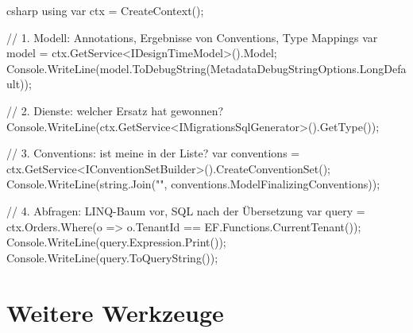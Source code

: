 \begin{sourcecode}{csharp}
using var ctx = CreateContext();

// 1. Modell: Annotations, Ergebnisse von Conventions, Type Mappings
var model = ctx.GetService<IDesignTimeModel>().Model;
Console.WriteLine(model.ToDebugString(MetadataDebugStringOptions.LongDefault));

// 2. Dienste: welcher Ersatz hat gewonnen?
Console.WriteLine(ctx.GetService<IMigrationsSqlGenerator>().GetType());

// 3. Conventions: ist meine in der Liste?
var conventions = ctx.GetService<IConventionSetBuilder>().CreateConventionSet();
Console.WriteLine(string.Join("\n", conventions.ModelFinalizingConventions));

// 4. Abfragen: LINQ-Baum vor, SQL nach der Übersetzung
var query = ctx.Orders.Where(o => o.TenantId == EF.Functions.CurrentTenant());
Console.WriteLine(query.Expression.Print());
Console.WriteLine(query.ToQueryString());
\end{sourcecode}

\section{Weitere Werkzeuge}

